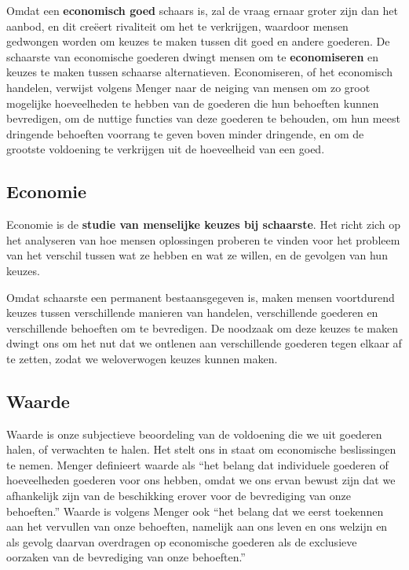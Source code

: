 Omdat een \textbf{economisch goed} schaars is, zal de vraag ernaar groter zijn dan het aanbod, en dit creëert rivaliteit om het te verkrijgen, waardoor mensen gedwongen worden om keuzes te maken tussen dit goed en andere goederen. De schaarste van economische goederen dwingt mensen om te \textbf{economiseren} en keuzes te maken tussen schaarse alternatieven. Economiseren, of het economisch handelen, verwijst volgens Menger naar de neiging van mensen om zo groot mogelijke hoeveelheden te hebben van de goederen die hun behoeften kunnen bevredigen, om de nuttige functies van deze goederen te behouden, om hun meest dringende behoeften voorrang te geven boven minder dringende, en om de grootste voldoening te verkrijgen uit de hoeveelheid van een goed.

\subsection{Economie}

Economie is de \textbf{studie van menselijke keuzes bij schaarste}. Het richt zich op het analyseren van hoe mensen oplossingen proberen te vinden voor het probleem van het verschil tussen wat ze hebben en wat ze willen, en de gevolgen van hun keuzes. 

Omdat schaarste een permanent bestaansgegeven is, maken mensen voortdurend keuzes tussen verschillende manieren van handelen, verschillende goederen en verschillende behoeften om te bevredigen. De noodzaak om deze keuzes te maken dwingt ons om het nut dat we ontlenen aan verschillende goederen tegen elkaar af te zetten, zodat we weloverwogen keuzes kunnen maken.

\subsection{Waarde}

Waarde is onze subjectieve beoordeling van de voldoening die we uit goederen halen, of verwachten te halen. Het stelt ons in staat om economische beslissingen te nemen. Menger definieert waarde als “het belang dat individuele goederen of hoeveelheden goederen voor ons hebben, omdat we ons ervan bewust zijn dat we afhankelijk zijn van de beschikking erover voor de bevrediging van onze behoeften.”\autocite{15} Waarde is volgens Menger ook “het belang dat we eerst toekennen aan het vervullen van onze behoeften, namelijk aan ons leven en ons welzijn en als gevolg daarvan overdragen op economische goederen als de exclusieve oorzaken van de bevrediging van onze behoeften.”\autocite{16}

